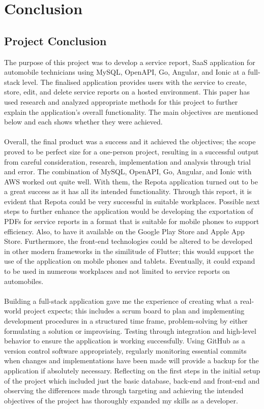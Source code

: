 \chapter{Conclusion}

\section{Project Conclusion}
The purpose of this project was to develop a service report, SaaS application for automobile technicians using MySQL, OpenAPI, Go, Angular, and Ionic at a full-stack level. The finalised application provides users with the service to create, store, edit, and delete service reports on a hosted environment. This paper has used research and analyzed appropriate methods for this project to further explain the application's overall functionality. The main objectives are mentioned below and each shows whether they were achieved.
\\\\ Overall, the final product was a success and it achieved the objectives; the scope proved to be perfect size for a one-person project, resulting in a successful output from careful consideration, research, implementation and analysis through trial and error. The combination of MySQL, OpenAPI, Go, Angular, and Ionic with AWS worked out quite well. With them, the Repota application turned out to be a great success as it has all its intended functionality. Through this report, it is evident that Repota could be very successful in suitable workplaces. Possible next steps to further enhance the application would be developing the exportation of PDFs for service reports in a format that is suitable for mobile phones to support efficiency. Also, to have it available on the Google Play Store and Apple App Store. Furthermore, the front-end technologies could be altered to be developed in other modern frameworks in the similitude of Flutter; this would support the use of the application on mobile phones and tablets. Eventually, it could expand to be used in numerous workplaces and not limited to service reports on automobiles.
\\\\ Building a full-stack application gave me the experience of creating what a real-world project expects; this includes a scrum board to plan and implementing development procedures in a structured time frame, problem-solving by either formulating a solution or improvising. Testing through integration and high-level behavior to ensure the application is working successfully. Using GitHub as a version control software appropriately, regularly monitoring essential commits when changes and implementations have been made will provide a backup for the application if absolutely necessary. Reflecting on the first steps in the initial setup of the project which included just the basic database, back-end and front-end and observing the differences made through targeting and achieving the intended objectives of the project has thoroughly expanded my skills as a developer. 

